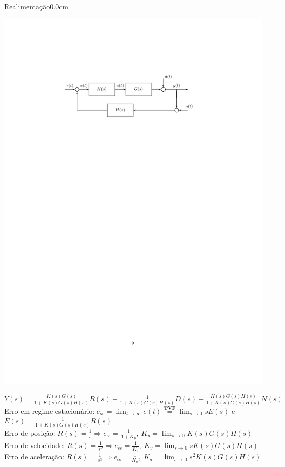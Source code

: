 \documentclass[portuguese,10pt,3col]{cheatsheet}
\begin{document}
\begin{multicols}{3}
\begin{cheatsheetbox}{Realimentação}{0.0cm}
    \begin{center}
        \includegraphics[scale = 0.5,  trim = 5cm 21.5cm 5.8cm 4.5cm, clip]{figs/fig10.pdf}
    \end{center}
    $Y(s) = \frac{K(s)G(s)}{1 + K(s)G(s)H(s)}R(s) + \frac{1}{1 + K(s)G(s)H(s)}D(s) - \frac{K(s)G(s)H(s)}{1 + K(s)G(s)H(s)}N(s)$ \\
    Erro em regime estacionário: $e_\text{ss} = \lim_{t \to \infty} e(t) \stackrel{\textbf{TVF}}{=} \lim_{s \to 0} sE(s)$ e $E(s) = \frac{1}{1 + K(s)G(s)H(s)}R(s)$ \\
    Erro de posição: $R(s) = \frac{1}{s} \Rightarrow e_\text{ss} = \frac{1}{1 + K_p}, \ K_p = \lim_{s \to 0} K(s)G(s)H(s)$ \\
    Erro de velocidade: $R(s) = \frac{1}{s^2} \Rightarrow e_\text{ss} = \frac{1}{K_v}, \ K_v = \lim_{s \to 0} sK(s)G(s)H(s)$ \\
    Erro de aceleração: $R(s) = \frac{1}{s^3} \Rightarrow e_\text{ss} = \frac{1}{K_a}, \ K_a = \lim_{s \to 0} s^2K(s)G(s)H(s)$
\end{cheatsheetbox}


\end{multicols}
\end{document}
